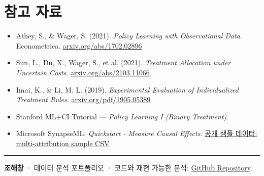 \documentclass[11pt]{article}
\begin{document}
\section*{\sffamily\color{brand} 참고 자료}
\small
\begin{itemize}[leftmargin=1.4em, itemsep=2pt]
  \item Athey, S., \& Wager, S. (2021). \emph{Policy Learning with Observational Data}. Econometrica. \href{https://arxiv.org/abs/1702.02896}{arxiv.org/abs/1702.02896}
  \item Sun, L., Du, X., Wager, S., et al. (2021). \emph{Treatment Allocation under Uncertain Costs}. \href{https://arxiv.org/abs/2103.11066}{arxiv.org/abs/2103.11066}
  \item Imai, K., \& Li, M. L. (2019). \emph{Experimental Evaluation of Individualized Treatment Rules}. \href{https://arxiv.org/pdf/1905.05389.pdf}{arxiv.org/pdf/1905.05389}
  \item Stanford ML+CI Tutorial --- \emph{Policy Learning I (Binary Treatment)}.
  \item Microsoft SynapseML. \emph{Quickstart - Measure Causal Effects}. \href{https://microsoft.github.io/SynapseML/docs/Explore%20Algorithms/Causal%20Inference/Quickstart%20-%20Measure%20Causal%20Effects/}{공개 샘플 데이터: multi-attribution sample CSV}
\end{itemize}

\vspace{1em}
{\color{rulegray}\hrule}
\vspace{4pt}
{\footnotesize\color{ink} \textbf{조해창} · 데이터 분석 포트폴리오 · 코드와 재현 가능한 분석: \href{https://github.com/Funbucket/Promotion-Targeting-with-Policy-Learning}{GitHub Repository}.}
\end{document}
